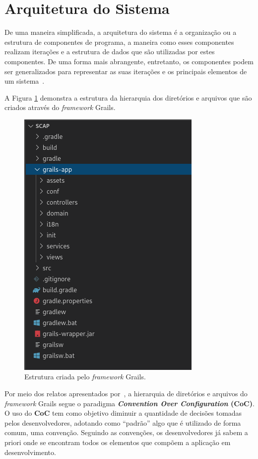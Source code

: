 \section{Arquitetura do Sistema}
\label{sec-projeto-arquitetura-sistema}

De uma maneira simplificada, a arquitetura do sistema é a organização ou a estrutura de componentes de programa, a maneira como esses componentes realizam iterações e a estrutura de dados que são utilizadas por estes componentes. De uma forma mais abrangente, entretanto, os componentes podem ser generalizados para representar as suas iterações e os principais elementos de um sistema~\cite{pressman:es11}.

A Figura \ref{fig-projeto-estrutura-grails} demonstra a estrutura da hierarquia dos diretórios e arquivos que são criados através do \textit{framework} Grails.

\begin{figure}[h]
	\centering
	\includegraphics[scale=0.7]{figuras/fig-projeto-estrutura-grails} 
	\caption{Estrutura criada pelo \textit{framework} Grails.}
	\label{fig-projeto-estrutura-grails}
\end{figure}

Por meio dos relatos apresentados por~, a hierarquia de diretórios e arquivos do \textit{framework} Grails segue o paradigma \textbf{\textit{Convention Over Configuration} (CoC)}. O uso do \textbf{CoC} tem como objetivo diminuir a quantidade de decisões tomadas pelos desenvolvedores, adotando como ``padrão'' algo que é utilizado de forma comum, uma convenção. Seguindo as convenções, os desenvolvedores já sabem a priori onde se encontram todos os elementos que compõem a aplicação em desenvolvimento.


